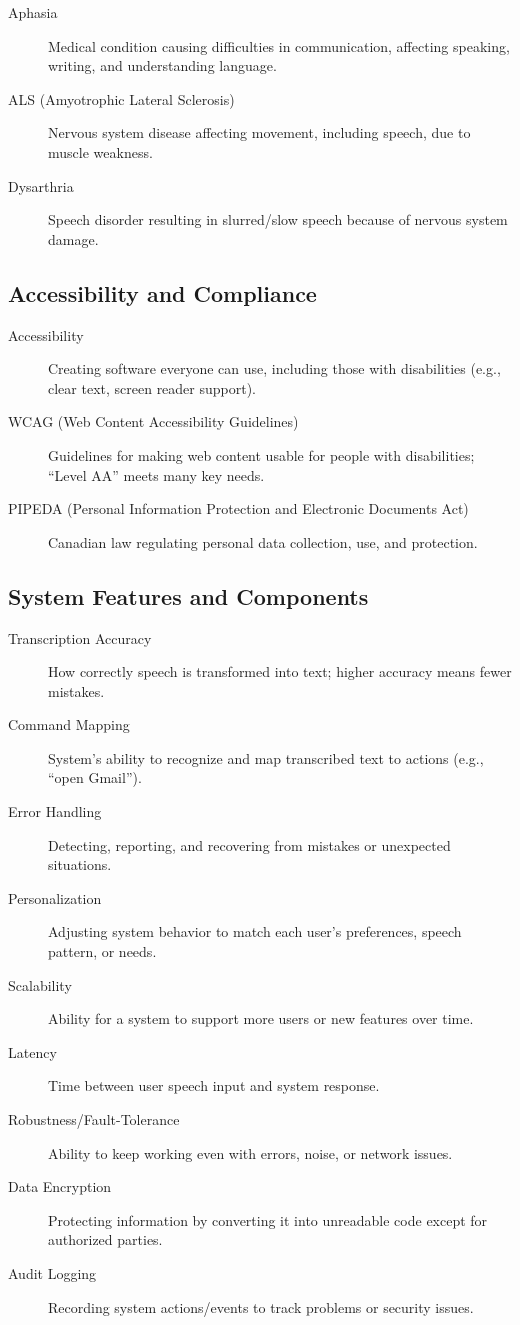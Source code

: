 \documentclass[11pt]{article}
\begin{document}
\begin{description}
  \item[Aphasia] Medical condition causing difficulties in communication, affecting speaking, writing, and understanding language.
  \item[ALS (Amyotrophic Lateral Sclerosis)] Nervous system disease affecting movement, including speech, due to muscle weakness.
  \item[Dysarthria] Speech disorder resulting in slurred/slow speech because of nervous system damage.
\end{description}

\subsection*{Accessibility and Compliance}

\begin{description}
  \item[Accessibility] Creating software everyone can use, including those with disabilities (e.g., clear text, screen reader support).
  \item[WCAG (Web Content Accessibility Guidelines)] Guidelines for making web content usable for people with disabilities; “Level AA” meets many key needs.
  \item[PIPEDA (Personal Information Protection and Electronic Documents Act)] Canadian law regulating personal data collection, use, and protection.
\end{description}

\subsection*{System Features and Components}

\begin{description}
  \item[Transcription Accuracy] How correctly speech is transformed into text; higher accuracy means fewer mistakes.
  \item[Command Mapping] System’s ability to recognize and map transcribed text to actions (e.g., “open Gmail”).
  \item[Error Handling] Detecting, reporting, and recovering from mistakes or unexpected situations.
  \item[Personalization] Adjusting system behavior to match each user’s preferences, speech pattern, or needs.
  \item[Scalability] Ability for a system to support more users or new features over time.
  \item[Latency] Time between user speech input and system response.
  \item[Robustness/Fault-Tolerance] Ability to keep working even with errors, noise, or network issues.
  \item[Data Encryption] Protecting information by converting it into unreadable code except for authorized parties.
  \item[Audit Logging] Recording system actions/events to track problems or security issues.
\end{description}
\end{document}
